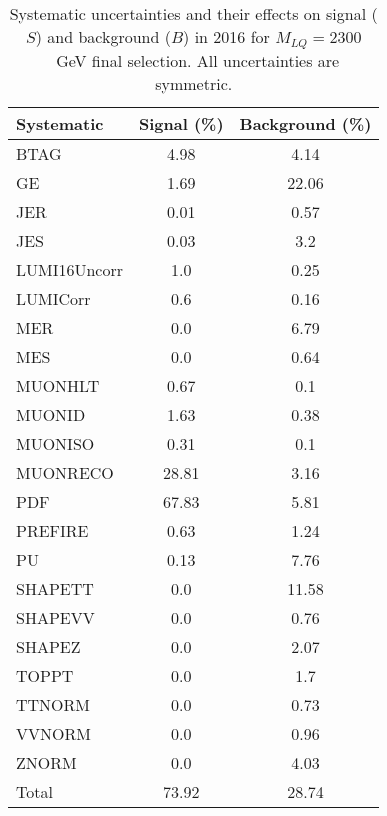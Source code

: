 \begin{table}[htbp]
\begin{center}
\caption{Systematic uncertainties and their effects on signal ($S$) and background ($B$) in 2016 for $M_{LQ}=2300$~GeV final selection. All uncertainties are symmetric.}
\begin{tabular}{lcc}
\hline\hline
Systematic & Signal (\%) & Background (\%) \\ \hline 
BTAG & 4.98 & 4.14\\ 
GE & 1.69 & 22.06\\ 
JER & 0.01 & 0.57\\ 
JES & 0.03 & 3.2\\ 
LUMI16Uncorr & 1.0 & 0.25\\ 
LUMICorr & 0.6 & 0.16\\ 
MER & 0.0 & 6.79\\ 
MES & 0.0 & 0.64\\ 
MUONHLT & 0.67 & 0.1\\ 
MUONID & 1.63 & 0.38\\ 
MUONISO & 0.31 & 0.1\\ 
MUONRECO & 28.81 & 3.16\\ 
PDF & 67.83 & 5.81\\ 
PREFIRE & 0.63 & 1.24\\ 
PU & 0.13 & 7.76\\ 
SHAPETT & 0.0 & 11.58\\ 
SHAPEVV & 0.0 & 0.76\\ 
SHAPEZ & 0.0 & 2.07\\ 
TOPPT & 0.0 & 1.7\\ 
TTNORM & 0.0 & 0.73\\ 
VVNORM & 0.0 & 0.96\\ 
ZNORM & 0.0 & 4.03\\ 
Total & 73.92 & 28.74\\ \hline \hline
\end{tabular}
\label{tab:SysUncertainties_uujj_2300}
\end{center}
\end{table}

